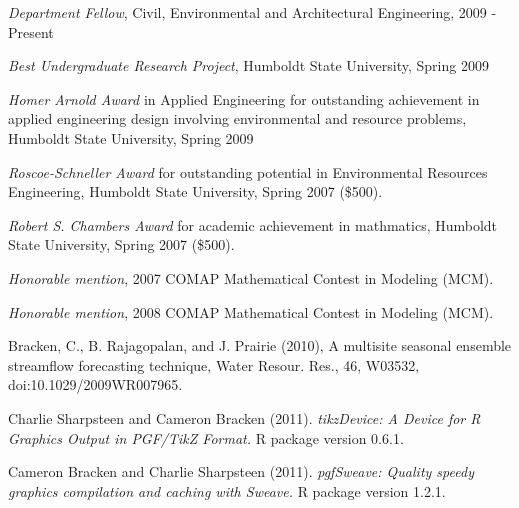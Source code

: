 \documentclass[10pt,a4paper]{scrartcl}
\begin{document}
\begin{cv}{}
        \begin{cvlist}{}\label{awards}
            \item   \textit{Department Fellow}, Civil, Environmental and Architectural Engineering, 2009 - Present
            \item   \textit{Best Undergraduate Research Project}, Humboldt State University, Spring 2009
            \item   \textit{Homer Arnold Award} in Applied Engineering for outstanding achievement in applied engineering design involving environmental and resource problems, Humboldt State University, Spring 2009 
            \item   \textit{Roscoe-Schneller Award} for outstanding potential in Environmental Resources Engineering, Humboldt State University, Spring 2007 (\$500).

	        \item \textit{Robert S. Chambers Award} for academic achievement in mathmatics, Humboldt State University, Spring 2007 (\$500).

	        \item \textit{Honorable mention}, 2007 COMAP Mathematical Contest in Modeling (MCM).
	
	        \item \textit{Honorable mention}, 2008 COMAP Mathematical Contest in Modeling (MCM).
        \end{cvlist}
        
        \begin{cvlist}{}\label{pub}
            \item   Bracken, C., B. Rajagopalan, and J. Prairie (2010), A multisite seasonal ensemble streamflow forecasting technique, Water Resour. Res., 46, W03532, doi:10.1029/2009WR007965.
        \end{cvlist}

        \begin{cvlist}{}\label{software}
            \item Charlie Sharpsteen and Cameron Bracken (2011). \textit{tikzDevice: A Device for R Graphics Output in PGF/TikZ Format.}  R package version 0.6.1.
            \item Cameron Bracken  and Charlie Sharpsteen (2011). \textit{pgfSweave: Quality speedy graphics compilation and caching with Sweave.} R package version 1.2.1.
        \end{cvlist}


\end{cv}
\end{document}
